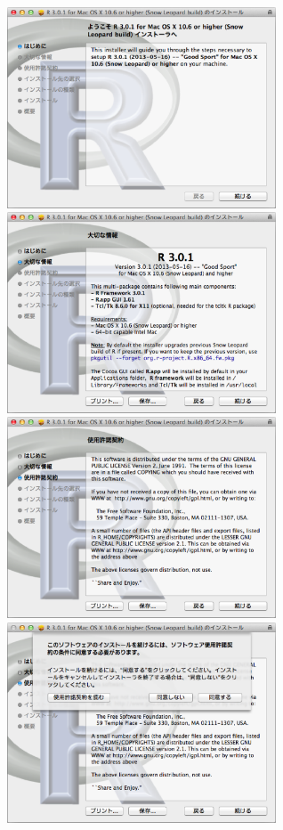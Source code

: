 \documentclass[a4paper,10pt,fleqn]{jarticle}
\begin{document}
\includegraphics[width=8cm]{img/osx/osx002.eps}\hspace{0.8em} \includegraphics[width=8cm]{img/osx/osx003.eps} \\

\includegraphics[width=8cm]{img/osx/osx004.eps}\hspace{0.8em} \includegraphics[width=8cm]{img/osx/osx005.eps}\\
\end{document}
